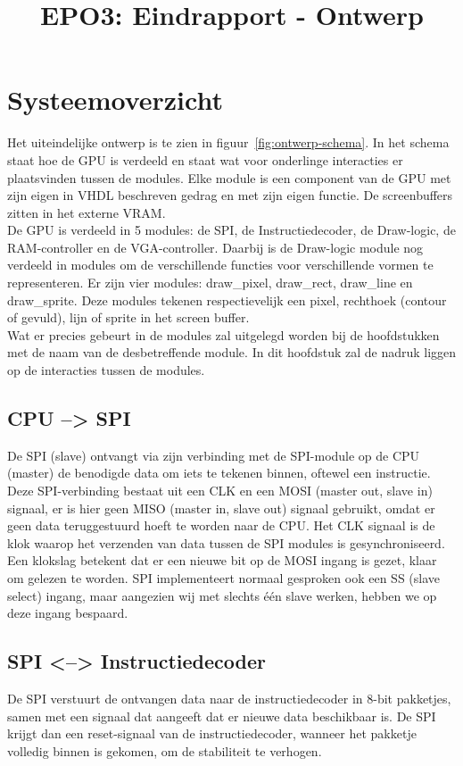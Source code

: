 \documentclass{scrartcl} %
\author{}
\title{EPO3: Eindrapport - Ontwerp}
\begin{document}
\chapter{Systeemoverzicht}
\label{ch:ontwerp}

Het uiteindelijke ontwerp is te zien in figuur~\ref{fig:ontwerp-schema}. In het schema staat hoe de GPU is verdeeld en staat wat voor onderlinge interacties er plaatsvinden tussen de modules.
Elke module is een component van de GPU met zijn eigen in VHDL beschreven gedrag en met zijn eigen functie. De screenbuffers zitten in het externe VRAM. 
\\
De GPU is verdeeld in 5 modules: de SPI, de Instructiedecoder, de Draw-logic, de RAM-controller en de VGA-controller. Daarbij is de Draw-logic module nog verdeeld in modules om de verschillende functies voor verschillende vormen te representeren. Er zijn vier modules: draw\_pixel, draw\_rect, draw\_line en draw\_sprite. Deze modules tekenen respectievelijk een pixel, rechthoek (contour of gevuld), lijn of sprite in het screen buffer.
\\
Wat er precies gebeurt in de modules zal uitgelegd worden bij de hoofdstukken met de naam van de desbetreffende module. In dit hoofdstuk zal de nadruk liggen op de interacties tussen de modules.

\section{CPU --> SPI}
De SPI (slave) ontvangt via zijn verbinding met de SPI-module op de CPU (master) de benodigde data om iets te tekenen binnen, oftewel een instructie. Deze SPI-verbinding bestaat uit een CLK en een MOSI (master out, slave in) signaal, er is hier geen MISO (master in, slave out) signaal gebruikt, omdat er geen data teruggestuurd hoeft te worden naar de CPU. Het CLK signaal is de klok waarop het verzenden van data tussen de SPI modules is gesynchroniseerd. Een klokslag betekent dat er een nieuwe bit op de MOSI ingang is gezet, klaar om gelezen te worden. 
SPI implementeert normaal gesproken ook een SS (slave select) ingang, maar aangezien wij met slechts één slave werken, hebben we op deze ingang bespaard.

\section{SPI <--> Instructiedecoder}
De SPI verstuurt de ontvangen data naar de instructiedecoder in 8-bit pakketjes, samen met een signaal dat aangeeft dat er nieuwe data beschikbaar is. De SPI krijgt dan een reset-signaal van de instructiedecoder, wanneer het pakketje volledig binnen is gekomen, om de stabiliteit te verhogen.
\end{document}

